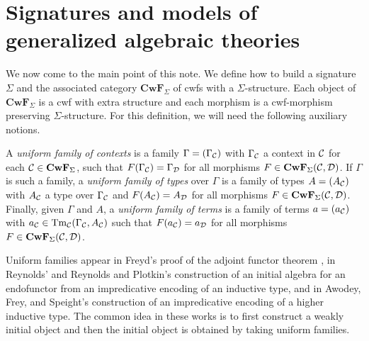 \documentclass{lmcs}
\def\D{\mathcal{D}}
\def\Cwf{\mathbf{CwF}}
\begin{document}
\section{Signatures and models of generalized algebraic theories}\label{gat-sig-mod}

We now come to the main point of this note.
We define how to build a signature $\Sigma$ and the associated category $\Cwf_{\Sigma}$ of cwfs with a $\Sigma$-structure.
Each object of $\Cwf_{\Sigma}$ is a cwf with extra structure and
each morphism is a cwf-morphism preserving $\Sigma$-structure.
For this definition, we will need the following auxiliary notions.

A {\em uniform family of contexts} is a family $\Gamma = (\Gamma_{{\mathcal C}})$ with $\Gamma_{\mathcal C}$ a context in
${\mathcal C}$ for each $\C \in \Cwf_{\Sigma}$, such that
$F(\Gamma_\C) = \Gamma_\D$ for all morphisms $F \in \Cwf_{\Sigma}(\C,\D)$.
If $\Gamma$ is such a family, a {\em uniform family of types} over $\Gamma$ is a
family of types $A = (A_{{\mathcal C}})$ with $A_{{\mathcal C}}$ a type over $\Gamma_{{\mathcal C}}$ and
$F(A_{\C}) = A_{\D}$ for all morphisms $F \in \Cwf_{\Sigma}(\C,\D)$.
Finally, given $\Gamma$ and $A$, a {\em uniform family of terms} is a family
of terms $a = (a_{{\mathcal C}})$ with $a_{\mathcal C} \in \mathrm{Tm}_{{\mathcal C}}(\Gamma_{{\mathcal C}},A_{{\mathcal C}})$ such that
$F(a_{\C}) = a_{\D}$ for all morphisms $F \in \Cwf_{\Sigma}(\C,\D)$.

\begin{remark}
Uniform families appear in Freyd's proof of the adjoint functor theorem \cite{freyd:abelian}, in Reynolds' \cite{reynolds:impredicative} and Reynolds and Plotkin's construction \cite{plotkin-reynolds} of an initial algebra for an endofunctor from an impredicative encoding of an inductive type, and in Awodey, Frey, and Speight's  \cite{awodey:impredicative} construction of an impredicative encoding of a higher inductive type. The common idea in these works is to first construct a weakly initial object and then the initial object is obtained by taking uniform families.
\end{remark}
\end{document}
